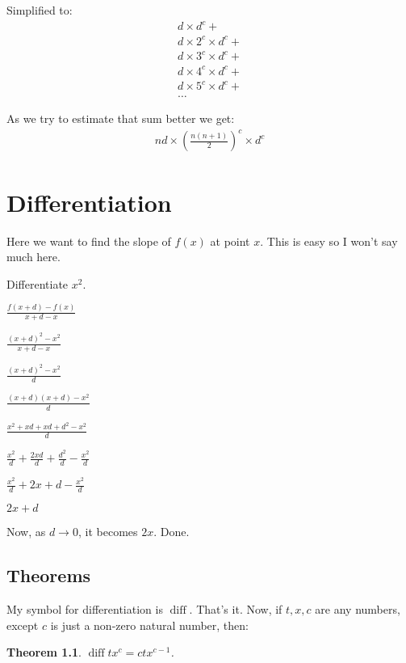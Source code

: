 \documentclass{report}
\newtheorem{theorem}{Theorem}
\DeclareMathOperator{\diff}{diff}
\begin{document}
    Simplified to:
    \[\begin{split}
        d \times d^c + \\
        d \times 2^c \times d^c + \\
        d \times 3^c \times d^c + \\
        d \times 4^c \times d^c + \\
        d \times 5^c \times d^c + \\
        \ldots
    \end{split}\]

    As we try to estimate that sum better we get:
    \[\begin{split}
        nd \times (\frac{n(n+1)}{2})^c \times d^c
    \end{split}\]




\chapter{Differentiation}
Here we want to find the slope of $f(x)$ at point $x$. This is easy so I won't
say much here.

Differentiate $x^2$.

$\frac{f(x+d) - f(x)}{x + d - x}$

$\frac{(x+d)^2 - x^2}{x + d - x}$

$\frac{(x+d)^2 - x^2}{d}$

$\frac{(x+d)(x+d) - x^2}{d}$

$\frac{x^2 + xd + xd + d^2 - x^2}{d}$

$\frac{x^2}{d} + \frac{2xd}{d} + \frac{d^2}{d} - \frac{x^2}{d}$

$\frac{x^2}{d} + 2x + d - \frac{x^2}{d}$

$2x + d$

Now, as $d \rightarrow 0$, it becomes $2x$. Done.

\section{Theorems}
My symbol for differentiation is $\diff$. That's it. Now, if $t, x, c$ are any
numbers, except $c$ is just a non-zero natural number, then:
\begin{theorem}
    $\diff tx^c = ctx^{c-1}$.
\end{theorem}
\end{document}
